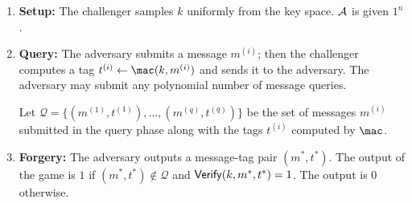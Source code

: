 \begin{definition}
$ $
   \begin{enumerate}
        \item \textbf{Setup:} The challenger samples $k$ uniformly from the key space. $\mathcal{A}$ is given $1^n$.
        \item \textbf{Query:} The adversary submits a message $m^{(i)}$; then the challenger computes a tag $t^{(i)} \gets \mac(k, m^{(i)})$ and sends it to the adversary. The adversary may submit any polynomial number of message queries.
        
        Let $\mathcal{Q} = \{(m^{(1)}, t^{(1)}), \dots, (m^{(q)}, t^{(q)})\}$ be the set of messages $m^{(i)}$ submitted in the query phase along with the tags $t^{(i)}$ computed by $\mac$.
        \item \textbf{Forgery:} The adversary outputs a message-tag pair $(m^*, t^*)$. The output of the game is $1$ if $(m^*,t^*) \notin \mathcal{Q}$ and $\mathsf{Verify}(k, m^*, t^*) = 1$. The output is $0$ otherwise.
    \end{enumerate}
\end{definition}



 